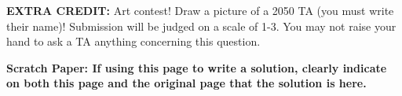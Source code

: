 \documentclass[11pt,addpoints]{exam}
\begin{document}
\begin{questions}








\newpage

\question \textbf{EXTRA CREDIT:} 
Art contest! Draw a picture of a 2050 TA (you must write their name)! Submission will be judged on a scale of 1-3. You may not raise your hand to ask a TA anything concerning this question.

\newpage

\textbf{Scratch Paper: If using this page to write a solution, clearly indicate on both this page and the original page that the solution is here.}\\

\end{questions}
\end{document}
